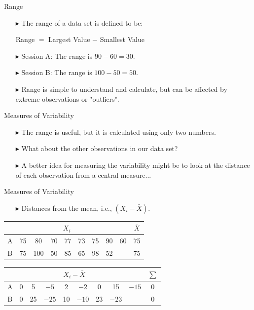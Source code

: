 \documentclass[12pt]{beamer}
\begin{document}
\begin{frame}{Range}
	\begin{itemize}
		\item[$\blacktriangleright$] The range of a data set is defined to be:
		
		\vspace{0.5cm}
		Range $=$ Largest Value $-$ Smallest Value
		
		\vspace{0.5cm}
		\item[$\blacktriangleright$] Session A: The range is $90- 60 = 30$.
		\item[$\blacktriangleright$] Session B: The range is $100-50 = 50$.
		\item[$\blacktriangleright$] Range is simple to understand and calculate, but can be affected by extreme observations or "outliers".
	\end{itemize}
\end{frame}
\begin{frame}{Measures of Variability}
	\begin{itemize}
		\item[$\blacktriangleright$] The range is useful, but it is calculated using only two numbers.
		\item[$\blacktriangleright$] What about the other observations in our data set?
		\item[$\blacktriangleright$] A better idea for measuring the variability might be to look at the distance of each observation from a central measure...
	\end{itemize}
\end{frame}
\begin{frame}{Measures of Variability}
	\begin{itemize}
		\item[$\blacktriangleright$]Distances from the mean, i.e., $(X_i-\bar{X})$.
	\end{itemize}
	\begin{center}
		\begin{tabular}{|c|c|c|c|c|c|c|c|c|c|}
			\hline
			\multicolumn{9}{|c|}{$X_i$} & $\bar{X}$\\ \hline
			\hline
			A & 75& 80 & 70 & 77 & 73 & 75 & 90 & 60&75\\
			\hline
			B & 75 & 100 & 50 & 85 & 65 & 98 & 52 &&75\\
			\hline
		\end{tabular}
		
		\vspace{0.5cm}
		
		\begin{tabular}{|c|c|c|c|c|c|c|c|c|c|}
			\hline
			\multicolumn{9}{|c|}{$X_i-\bar{X}$} & $\sum$\\ \hline
			\hline
			A & 0& 5 & $-5$ & 2 & $-2$ & 0 & 15 & $-15$&0\\
			\hline
			B & 0 & 25 & $-25$ & 10 & $-10$ & 23& $-23$ &&0\\
			\hline
		\end{tabular}
	\end{center}
\end{frame}
\end{document}
